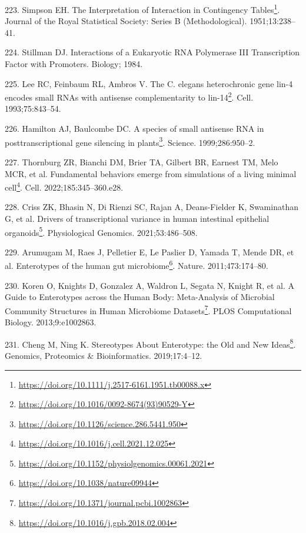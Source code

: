 \documentclass[
  12pt,
  a4paper,
  twoside,
  openright]{book}
\DeclareRobustCommand{\href}[2]{#2\footnote{\url{#1}}}
\newlength{\cslhangindent}
\newlength{\cslentryspacingunit} %
\newenvironment{CSLReferences}[2] %
 {%
  \setlength{\parindent}{0pt}
  \ifodd #1
  \let\oldpar\par
  \def\par{\hangindent=\cslhangindent\oldpar}
  \fi
  \setlength{\parskip}{#2\cslentryspacingunit}
 }%
 {}
\begin{document}
\begin{CSLReferences}{0}{0}
\leavevmode{}%
223. Simpson EH. \href{https://doi.org/10.1111/j.2517-6161.1951.tb00088.x}{The Interpretation of Interaction in Contingency Tables}. Journal of the Royal Statistical Society: Series B (Methodological). 1951;13:238--41.

\leavevmode{}%
224. Stillman DJ. Interactions of a Eukaryotic RNA Polymerase III Transcription Factor with Promoters. Biology; 1984.

\leavevmode{}%
225. Lee RC, Feinbaum RL, Ambros V. \href{https://doi.org/10.1016/0092-8674(93)90529-Y}{The C. elegans heterochronic gene lin-4 encodes small RNAs with antisense complementarity to lin-14}. Cell. 1993;75:843--54.

\leavevmode{}%
226. Hamilton AJ, Baulcombe DC. \href{https://doi.org/10.1126/science.286.5441.950}{A species of small antisense RNA in posttranscriptional gene silencing in plants}. Science. 1999;286:950--2.

\leavevmode{}%
227. Thornburg ZR, Bianchi DM, Brier TA, Gilbert BR, Earnest TM, Melo MCR, et al. \href{https://doi.org/10.1016/j.cell.2021.12.025}{Fundamental behaviors emerge from simulations of a living minimal cell}. Cell. 2022;185:345--360.e28.

\leavevmode{}%
228. Criss ZK, Bhasin N, Di Rienzi SC, Rajan A, Deans-Fielder K, Swaminathan G, et al. \href{https://doi.org/10.1152/physiolgenomics.00061.2021}{Drivers of transcriptional variance in human intestinal epithelial organoids}. Physiological Genomics. 2021;53:486--508.

\leavevmode{}%
229. Arumugam M, Raes J, Pelletier E, Le Paslier D, Yamada T, Mende DR, et al. \href{https://doi.org/10.1038/nature09944}{Enterotypes of the human gut microbiome}. Nature. 2011;473:174--80.

\leavevmode{}%
230. Koren O, Knights D, Gonzalez A, Waldron L, Segata N, Knight R, et al. \href{https://doi.org/10.1371/journal.pcbi.1002863}{A Guide to Enterotypes across the Human Body: Meta-Analysis of Microbial Community Structures in Human Microbiome Datasets}. PLOS Computational Biology. 2013;9:e1002863.

\leavevmode{}%
231. Cheng M, Ning K. \href{https://doi.org/10.1016/j.gpb.2018.02.004}{Stereotypes About Enterotype: the Old and New Ideas}. Genomics, Proteomics \& Bioinformatics. 2019;17:4--12.


\end{CSLReferences}
\end{document}
